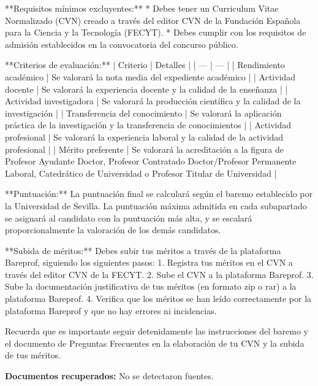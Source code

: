 \documentclass{article}
\begin{document}
\begin{itemize}
\begin{respuesta_agente}
**Requisitos mínimos excluyentes:**
* Debes tener un Curriculum Vitae Normalizado (CVN) creado a través del editor CVN de la Fundación Española para la Ciencia y la Tecnología (FECYT).
* Debes cumplir con los requisitos de admisión establecidos en la convocatoria del concurso público.

**Criterios de evaluación:**
| Criterio | Detalles |
| --- | --- |
| Rendimiento académico | Se valorará la nota media del expediente académico |
| Actividad docente | Se valorará la experiencia docente y la calidad de la enseñanza |
| Actividad investigadora | Se valorará la producción científica y la calidad de la investigación |
| Transferencia del conocimiento | Se valorará la aplicación práctica de la investigación y la transferencia de conocimientos |
| Actividad profesional | Se valorará la experiencia laboral y la calidad de la actividad profesional |
| Mérito preferente | Se valorará la acreditación a la figura de Profesor Ayudante Doctor, Profesor Contratado Doctor/Profesor Permanente Laboral, Catedrático de Universidad o Profesor Titular de Universidad |

**Puntuación:**
La puntuación final se calculará según el baremo establecido por la Universidad de Sevilla. La puntuación máxima admitida en cada subapartado se asignará al candidato con la puntuación más alta, y se escalará proporcionalmente la valoración de los demás candidatos.

**Subida de méritos:**
Debes subir tus méritos a través de la plataforma Bareprof, siguiendo los siguientes pasos:
1. Registra tus méritos en el CVN a través del editor CVN de la FECYT.
2. Sube el CVN a la plataforma Bareprof.
3. Sube la documentación justificativa de tus méritos (en formato zip o rar) a la plataforma Bareprof.
4. Verifica que los méritos se han leído correctamente por la plataforma Bareprof y que no hay errores ni incidencias.

Recuerda que es importante seguir detenidamente las instrucciones del baremo y el documento de Preguntas Frecuentes en la elaboración de tu CVN y la subida de tus méritos.
    \end{respuesta_agente}
    \vspace{0.2cm}
    \noindent\textbf{Documentos recuperados:} No se detectaron fuentes.

\end{itemize}
\end{document}
